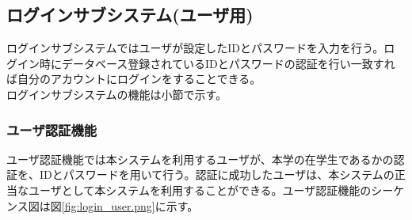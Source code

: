 \documentclass[a4j]{jarticle}
\begin{document}
\subsection{ログインサブシステム(ユーザ用)}
ログインサブシステムではユーザが設定したIDとパスワードを入力を行う。ログイン時にデータベース登録されているIDとパスワードの認証を行い一致すれば自分のアカウントにログインをすることできる。\\
ログインサブシステムの機能は小節で示す。
    \subsubsection{ユーザ認証機能}
    ユーザ認証機能では本システムを利用するユーザが、本学の在学生であるかの認証を、IDとパスワードを用いて行う。認証に成功したユーザは、本システムの正当なユーザとして本システムを利用することができる。ユーザ認証機能のシーケンス図は図\ref{fig:login_user.png}に示す。
\end{document}
